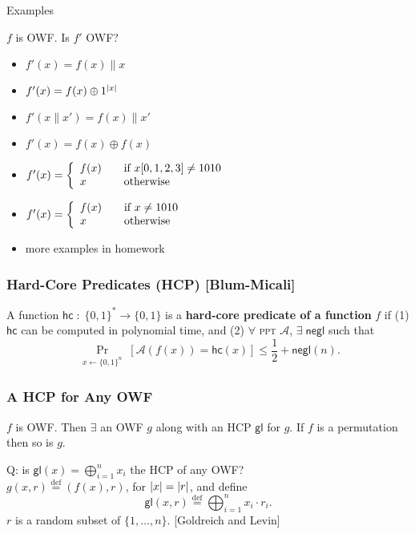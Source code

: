 \begin{frame}{Examples}
\begin{exampleblock}{$f$ is OWF. Is $f'$ OWF?}
\begin{itemize}
\item $f'(x) = f(x)\| x$
\item $f'(x) = f(x)\oplus 1^{\lvert x\rvert}$
\item $f'(x\|x') = f(x)\|x'$
\item $f'(x) = f(x) \oplus f(x)$
\item $ f'(x) = \left\{ 
  \begin{array}{l l}
    f(x) & \quad \text{if $x[0,1,2,3] \neq 1010$}\\
    x & \quad \text{otherwise}\\
  \end{array} \right. $
\item $ f'(x) = \left\{ 
  \begin{array}{l l}
    f(x) & \quad \text{if $x \neq 1010$}\\
    x & \quad \text{otherwise}\\
  \end{array} \right. $
\item more examples in homework
\end{itemize}
\end{exampleblock}
\end{frame}
\begin{frame}\frametitle{Hard-Core Predicates (HCP) [Blum-Micali]}
\begin{figure}
\begin{center}

\end{center}
\end{figure}
\begin{definition}
A function $\mathsf{hc}\; : \; \{0,1\}^* \to \{0,1\}$ is a \textbf{hard-core predicate of a function} $f$ if (1) $\mathsf{hc}$ can be computed in polynomial time, and (2) $\forall$ \textsc{ppt} $\mathcal{A}$, $\exists\; \mathsf{negl}$ such that
\[ \Pr_{\substack{x \gets \{0,1\}^n}}[\mathcal{A}(f(x)) = \mathsf{hc}(x)] \le \frac{1}{2} + \mathsf{negl}(n). \]
\end{definition}
\end{frame}
\begin{frame}\frametitle{A HCP for Any OWF}
\begin{theorem}
$f$ is OWF. Then $\exists$ an OWF $g$ along with an HCP $\mathsf{gl}$ for $g$. If $f$ is a permutation then so is $g$.
\end{theorem}
\alert{Q: is $\mathsf{gl}(x) = \bigoplus^{n}_{i=1} x_i$ the HCP of any OWF?}\\

$g(x,r) \overset{\text{def}}{=} (f(x), r)$, for $\lvert x\rvert = \lvert r\rvert$, and define
\[ \mathsf{gl}(x,r) \overset{\text{def}}{=} \bigoplus^{n}_{i=1} x_i \cdot r_i. \]
$r$ is a random subset of $\{ 1,\dotsc, n \}$. [Goldreich and Levin]
\end{frame}

